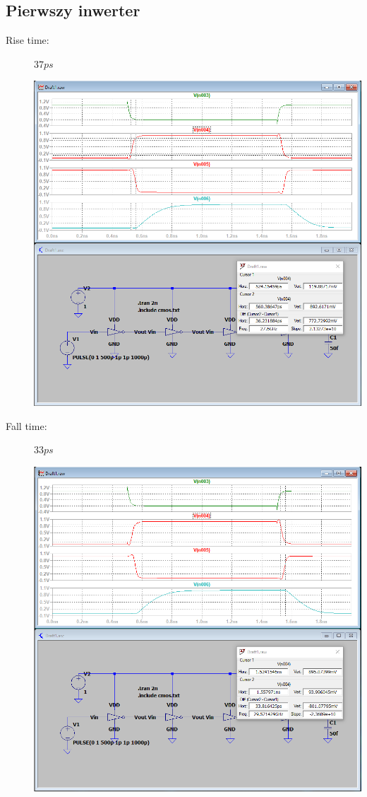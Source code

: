 \documentclass[a4paper, 11pt]{article}
\begin{document}
\subsection{Pierwszy inwerter}
\begin{description}
	\item[Rise time:] $37 ps$ \hfill
	      \begin{center}
		      \includegraphics[scale=0.38]{mikro_lab3/rise_time1.PNG}
	      \end{center}
	\item[Fall time:] $33 ps$ \hfill
	      \begin{center}
		      \includegraphics[scale=0.38]{mikro_lab3/fall_time1.PNG}

\end{center}
\end{description}
\end{document}
